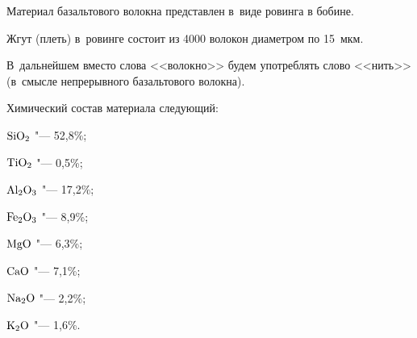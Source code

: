 Материал базальтового волокна представлен в~виде ровинга в бобине. 

Жгут (плеть) в~ровинге состоит из 4000 волокон диаметром по 15~мкм. 

В~дальнейшем вместо слова <<волокно>> будем употреблять слово <<нить>> (в~смысле непрерывного базальтового волокна).



Химический состав материала следующий:

$\rm SiO_2$ "--- 52,8\%; 

$\rm TiO_2$ "--- 0,5\%; 

$\rm Al_2 O_3$ "--- 17,2\%; 

$\rm Fe_2 O_3$ "--- 8,9\%;

$\rm MgO$ "--- 6,3\%; 

$\rm CaO$ "--- 7,1\%;

$\rm Na_2 O$ "--- 2,2\%;

$\rm K_2 O$ "--- 1,6\%.







